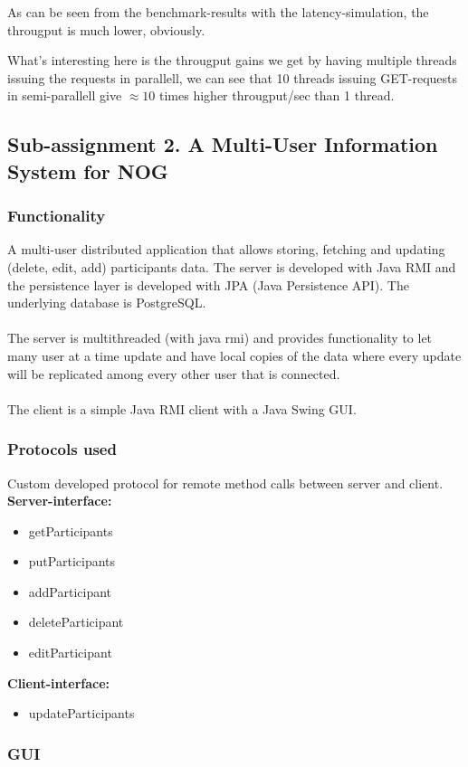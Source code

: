 \documentclass[a4paper, 11pt]{article}
\begin{document}
As can be seen from the benchmark-results with the latency-simulation, the througput is much lower, obviously.

What's interesting here is the througput gains we get by having multiple threads issuing the requests in parallell, we can see that 10 threads issuing GET-requests in semi-parallell give $\approx 10$ times higher througput/sec than 1 thread.
\subsection{Sub-assignment 2. A Multi-User Information System for NOG}
\subsubsection{Functionality}
A multi-user distributed application that allows storing, fetching and updating (delete, edit, add) participants data. The server is developed with Java RMI and the persistence layer is developed with JPA (Java Persistence API). The underlying database is PostgreSQL. \\ \\
The server is multithreaded (with java rmi) and provides functionality to let many user at a time update and have local copies of the data where every update will be replicated among every other user that is connected.
\\\\ The client is a simple Java RMI client with a Java Swing GUI.
\subsubsection{Protocols used}
Custom developed protocol for remote method calls between server and client. \\
\textbf{Server-interface:}
\begin{itemize}
\item getParticipants
\item putParticipants
\item addParticipant
\item deleteParticipant
\item editParticipant
\end{itemize} 
\textbf{Client-interface:}
\begin{itemize}
\item updateParticipants
\end{itemize}
\subsubsection{GUI}
\end{document}

